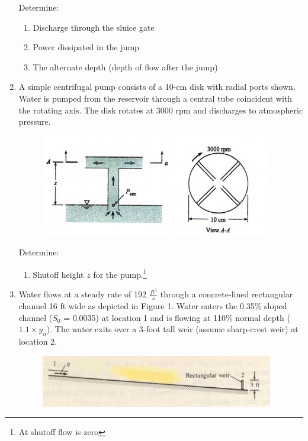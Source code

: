 \documentclass[12pt]{article}
\begin{document}
\begin{enumerate}
Determine:
\begin{enumerate}
\item Discharge through the sluice gate
\item Power dissipated in the jump
\item The alternate depth (depth of flow after the jump)
\end{enumerate}
\clearpage
\item A simple centrifugal pump consists of a 10-cm disk with radial ports shown.  Water is pumped from the reservoir through a central tube coincident with the rotating axis.  The disk rotates at 3000 rpm and discharges to atmospheric pressure.  

\begin{figure}[htbp] %
   \centering
   \includegraphics[width=4in]{centrifugepump.png} 
   \caption{}
   \label{fig:centrifugepump}
\end{figure}

Determine:
\begin{enumerate}
\item Shutoff height $z$ for the pump.\footnote{At shutoff flow is zero}
\end{enumerate}


\item Water flows at a steady rate of 192 $\frac{ft^3}{s}$ through a concrete-lined rectangular channel 16 ft wide as depicted in Figure 1. Water enters the 0.35\% sloped channel ($S_0$ = 0.0035) at location 1 and is flowing at 110\% normal depth ($1.1 \times y_n$). The water exits over a 3-foot tall weir (assume sharp-crest weir) at location 2.

\begin{figure}[htbp] %
   \centering
   \includegraphics[width=4in]{channel_profile.png} 
   \caption{}
   \label{fig:channel_profile}
\end{figure}


\end{enumerate}
\end{document}
